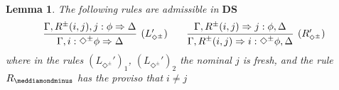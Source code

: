 \documentclass{easychair}
\newcommand{\DS}{\mathbf{DS}}
\newtheorem{lemma}{Lemma}
\begin{document}
\begin{lemma}\label{lemma:adm} The following rules are admissible in $\DS$
\[
\infer[(L_{\Diamond^\pm}')]{\Gamma, i: \Diamond^\pm \phi\Rightarrow \Delta}{\Gamma, R^\pm(i,j), j:\phi  \Rightarrow \Delta}  
\qquad
\infer[(R_{\Diamond^\pm}')]{\Gamma, R^\pm(i,j)\Rightarrow i: \Diamond^\pm \phi,\Delta}{\Gamma, R^\pm(i,j) \Rightarrow j: \phi, \Delta}
\]
where in the rules   $(L_{\Diamond^\pm}')_1$, $(L_{\Diamond^\pm}')_2$  the nominal $j$ is fresh, and the rule $R_{\meddiamondminus}$ has the proviso that $i\neq j$
\end{lemma}

 
\end{document}
